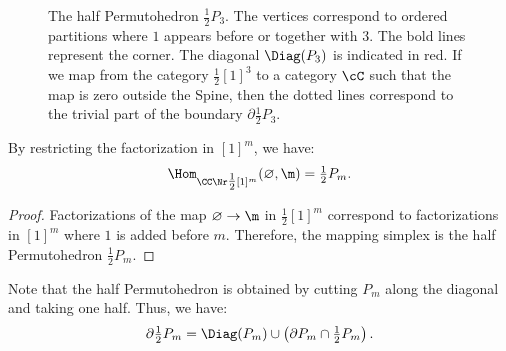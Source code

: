 \begin{figure}
    \centering
    \caption{The half Permutohedron $\tfrac{1}{2}P_3$. The vertices correspond to ordered partitions where $1$ appears before or together with $3$. The bold lines represent the corner. The diagonal $\Diag(P_3)$ is indicated in red. If we map from the category $\tfrac{1}{2}[1]^3$ to a category $\cC$ such that the map is zero outside the Spine, then the dotted lines correspond to the trivial part of the boundary $\partial \tfrac{1}{2}P_3$.}
    \label{fig:half_permu}
\end{figure}

\begin{cor}
By restricting the factorization in $[1]^m$, we have:
\begin{equation*}
    \Hom_{\CC \Nr \tfrac{1}{2}[1]^m}(\varnothing, \m) = \tfrac{1}{2}P_m.
\end{equation*}
\end{cor}

\begin{proof}
Factorizations of the map $\varnothing \to \m$ in $\tfrac{1}{2}[1]^m$ correspond to factorizations in $[1]^m$ where $1$ is added before $m$. Therefore, the mapping simplex is the half Permutohedron $\tfrac{1}{2}P_m$.
\end{proof}

Note that the half Permutohedron is obtained by cutting $P_m$ along the diagonal and taking one half. Thus, we have:
\begin{equation}\label{eq:bound_decomp}
    \partial \tfrac{1}{2}P_m = \Diag(P_m) \cup \left( \partial P_m \cap \tfrac{1}{2}P_m \right).
\end{equation}

